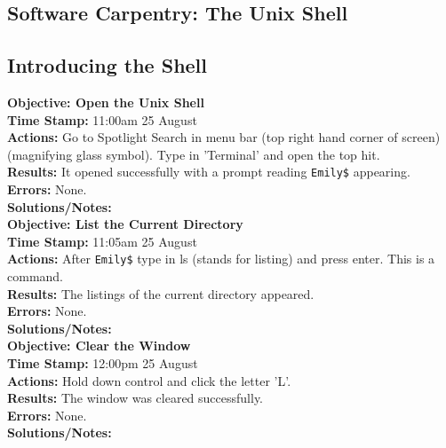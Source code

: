 \documentclass{article}
\begin{document}
\begin{FlushLeft}
\pagebreak

\section{Software Carpentry: The Unix Shell}
\subsection{Introducing the Shell}
\textbf{Objective: Open the Unix Shell}\\ 
\textbf{Time Stamp:} 11:00am 25 August\\
\textbf{Actions:} Go to Spotlight Search in menu bar (top right hand corner of screen)(magnifying glass symbol). Type in 'Terminal' and open the top hit.\\
\textbf{Results:} It opened successfully with a prompt reading \verb|Emily$| appearing.\\
\textbf{Errors:} None.\\
\textbf{Solutions/Notes:}\\
\vspace{5mm}
\textbf{Objective: List the Current Directory}\\ 
\textbf{Time Stamp:} 11:05am 25 August\\
\textbf{Actions:} After \verb|Emily$| type in ls (stands for listing) and press enter. This is a command.\\
\textbf{Results:} The listings of the current directory appeared.\\
\textbf{Errors:} None.\\
\textbf{Solutions/Notes:}\\
\vspace{5mm}
\textbf{Objective: Clear the Window}\\ 
\textbf{Time Stamp:} 12:00pm 25 August\\
\textbf{Actions:} Hold down control and click the letter 'L'.\\
\textbf{Results:} The window was cleared successfully.\\
\textbf{Errors:} None.\\
\textbf{Solutions/Notes:}\\
\vspace{5mm}


\end{FlushLeft}
\end{document}
